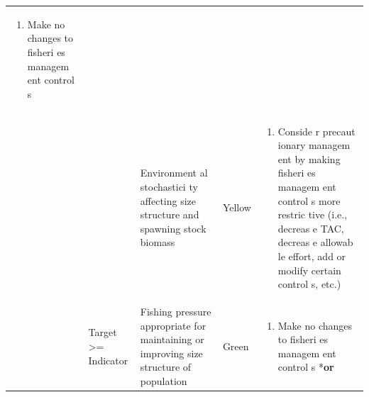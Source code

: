 \documentclass[]{book}
\providecommand{\tightlist}{%
  \setlength{\itemsep}{0pt}\setlength{\parskip}{0pt}}
\begin{document}
\begin{longtable}[]{@{}lllll@{}}
\begin{minipage}[t]{0.19\columnwidth}
\begin{enumerate}
\def\labelenumi{\arabic{enumi}.}
\tightlist
\item
  Make no changes to fisheri es managem ent control s
\end{enumerate}\strut
\end{minipage}\tabularnewline
\begin{minipage}[t]{0.19\columnwidth}\raggedright\strut
\strut
\end{minipage} & \begin{minipage}[t]{0.19\columnwidth}\raggedright\strut
\strut
\end{minipage} & \begin{minipage}[t]{0.19\columnwidth}\raggedright\strut
Environment al stochastici ty affecting size structure and spawning
stock biomass\strut
\end{minipage} & \begin{minipage}[t]{0.19\columnwidth}\raggedright\strut
Yellow\strut
\end{minipage} & \begin{minipage}[t]{0.19\columnwidth}\raggedright\strut
\begin{enumerate}
\def\labelenumi{\arabic{enumi}.}
\tightlist
\item
  Conside r precaut ionary managem ent by making fisheri es managem ent
  control s more restric tive (i.e., decreas e TAC, decreas e allowab le
  effort, add or modify certain control s, etc.)
\end{enumerate}\strut
\end{minipage}\tabularnewline
\begin{minipage}[t]{0.19\columnwidth}\raggedright\strut
\strut
\end{minipage} & \begin{minipage}[t]{0.19\columnwidth}\raggedright\strut
Target \textgreater{}= Indicator\strut
\end{minipage} & \begin{minipage}[t]{0.19\columnwidth}\raggedright\strut
Fishing pressure appropriate for maintaining or improving size structure
of population\strut
\end{minipage} & \begin{minipage}[t]{0.19\columnwidth}\raggedright\strut
Green\strut
\end{minipage} & \begin{minipage}[t]{0.19\columnwidth}\raggedright\strut
\begin{enumerate}
\def\labelenumi{\arabic{enumi}.}
\tightlist
\item
  Make no changes to fisheri es managem ent control s *\textbf{or}
\end{enumerate}


\end{minipage}
\end{longtable}
\end{document}
